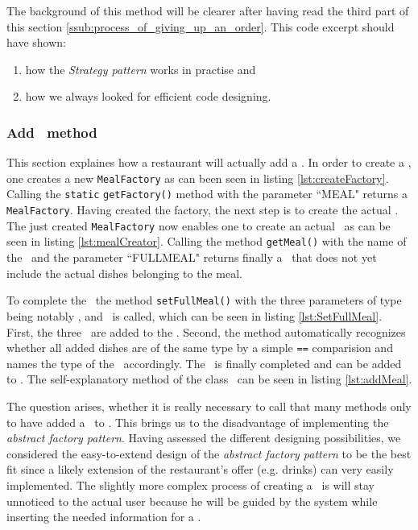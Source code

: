 The background of this method will be clearer after having read the third part of this section \ref{ssub:process_of_giving_up_an_order}. This code excerpt should have shown:

\begin{enumerate}
	\item how the \emph{Strategy pattern} works in practise and
	\item how we always looked for efficient code designing.
\end{enumerate}


\subsubsection{Add \FullMeal~method} %
\label{ssub:add_full_meal_method}

This section explaines how a restaurant will actually add a \FullMeal. In order to
create a \FullMeal, one creates a new \lstinline|MealFactory| as can been seen in
listing \ref{lst:createFactory}. Calling the \lstinline|static|
\lstinline|getFactory()| method with the parameter ``MEAL" returns a
\lstinline|MealFactory|. Having created the factory, the next step is to create 
the actual \FullMeal. The just created \lstinline|MealFactory| now enables one to
create an actual \Meal~as can be seen in listing \ref{lst:mealCreator}. Calling the
method \lstinline|getMeal()| with the name of the \Meal~and the parameter ``FULLMEAL"
returns finally a \FullMeal~that does not yet include the actual dishes belonging to
the meal. 

To complete the \FullMeal~the method \lstinline|setFullMeal()| with the three
parameters of type \Dish~ being notably \Starter, \MainDish and \Dessert~is called,
which can be seen in listing \ref{lst:SetFullMeal}. First, the three \Dish~are added to
the \FullMeal. Second, the method automatically recognizes whether all added dishes are
of the same type by a simple \lstinline|==| comparision and names the type of the
\Meal~accordingly. The \FullMeal~is finally completed and can be added to \Restaurant. 
The self-explanatory method of the class \Restaurant~can be seen in listing \ref{lst:addMeal}.

The question arises, whether it is really necessary to call that many methods only to 
have added a \FullMeal~to \Restaurant. This brings us to the disadvantage of
implementing the \emph{abstract factory pattern}. Having assessed the different
designing possibilities, we considered the easy-to-extend design of the 
\emph{abstract factory pattern} to be the best fit since a likely extension of the restaurant's offer (e.g. drinks) can very easily implemented. The slightly more complex process of creating a \FullMeal~is will stay unnoticed to the actual user because he will be guided by the system while inserting the needed information for a \FullMeal.

